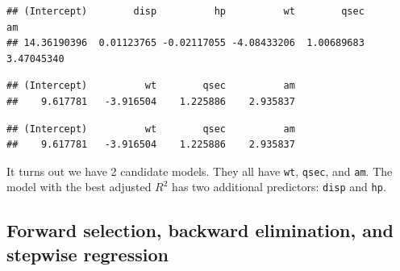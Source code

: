 \documentclass[
]{book}
\newenvironment{Shaded}{\begin{snugshade}}{\end{snugshade}}
\newcommand{\FunctionTok}[1]{\textcolor[rgb]{0.13,0.29,0.53}{\textbf{#1}}}
\newcommand{\NormalTok}[1]{#1}
\newcommand{\SpecialCharTok}[1]{\textcolor[rgb]{0.81,0.36,0.00}{\textbf{#1}}}
\begin{document}
\begin{Shaded}
\end{Shaded}

\begin{verbatim}
## (Intercept)        disp          hp          wt        qsec          am 
## 14.36190396  0.01123765 -0.02117055 -4.08433206  1.00689683  3.47045340
\end{verbatim}

\begin{Shaded}
\end{Shaded}

\begin{verbatim}
## (Intercept)          wt        qsec          am 
##    9.617781   -3.916504    1.225886    2.935837
\end{verbatim}

\begin{Shaded}
\end{Shaded}

\begin{verbatim}
## (Intercept)          wt        qsec          am 
##    9.617781   -3.916504    1.225886    2.935837
\end{verbatim}

It turns out we have 2 candidate models. They all have \texttt{wt}, \texttt{qsec}, and \texttt{am}. The model with the best adjusted \(R^2\) has two additional predictors: \texttt{disp} and \texttt{hp}.

\hypertarget{forward-selection-backward-elimination-and-stepwise-regression}{%
\subsection*{Forward selection, backward elimination, and stepwise regression}\label{forward-selection-backward-elimination-and-stepwise-regression}}
\end{document}
